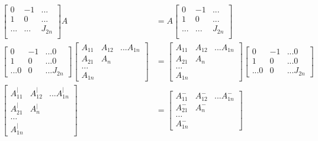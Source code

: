 \documentclass[11pt]{article}
\newcommand\0{\mathbf{0}}
\newcommand\<{\langle}
\renewcommand\>{\rangle}
\begin{document}
\begin{enumerate}
\begin{align*}
  \begin{bmatrix}
    0 & -1 & ...\\
    1 & 0 & ...\\
    ... & ...& J_{2n}\\
  \end{bmatrix} A&= 
  A\begin{bmatrix}
    0 & -1 & ...\\
    1 & 0 & ...\\
    ... & ...& J_{2n}\\
  \end{bmatrix} \\
  \begin{bmatrix}
    0& -1& ... 0\\
    1& 0& ... 0\\
    ... 0& 0&... J_{2n}
  \end{bmatrix}
  \begin{bmatrix}
    A_{11} & A_{12}& ... A_{1n}\\
    A_{21} & A_{n}\\
    \dots\\
    A_{1n}
  \end{bmatrix}&=
  \begin{bmatrix}
    A_{11} & A_{12}& ... A_{1n}\\
    A_{21} & A_{n}\\
    \dots\\
    A_{1n}
  \end{bmatrix}\begin{bmatrix}
    0& -1& ... 0\\
    1& 0& ... 0\\
    ... 0& 0&... J_{2n}
  \end{bmatrix}\\
  \begin{bmatrix}
    A^{\vert}_{11} & A^{\vert}_{12}& ... A^{\vert}_{1n}\\
    A^{\vert}_{21} & A^{\vert}_{n}\\
    \dots\\
    A^{\vert}_{1n}
  \end{bmatrix}&=
  \begin{bmatrix}
    A^{-}_{11} & A^{-}_{12}& ... A^{-}_{1n}\\
    A^{-}_{21} & A^{-}_{n}\\
    \dots\\
    A^{-}_{1n}
  \end{bmatrix}
\end{align*}  


\end{enumerate}
\end{document}
